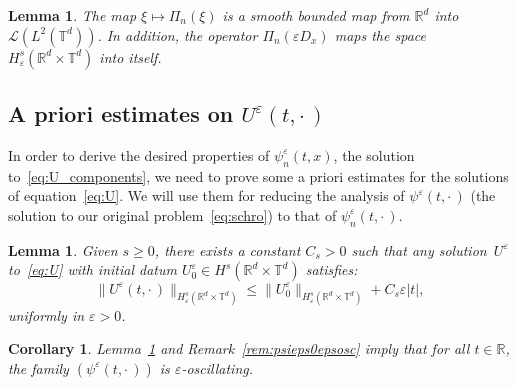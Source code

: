 \documentclass[10pt]{amsart}
\newtheorem{lemm}[cdrthm]{Lemma}
\newtheorem{coro}[cdrthm]{Corollary}
\theoremstyle{definition}
\newcommand*\R{{\mathbb R}}
\newcommand*\T{{\mathbb T}}
\newcommand*\eps{\varepsilon}
\numberwithin{equation}{section}
\begin{document}
\begin{lemm}\label{boundednessdPi}
The map $\xi\mapsto \Pi_n(\xi)$ is a smooth bounded map from $\R^d$ into ${\mathcal L} (L^2(\T^d))$. In addition, the operator $\Pi_n(\eps D_x)$ maps the space $H^s_\eps(\R^d\times\T^d)$ into itself.
\end{lemm}



\subsection{A priori estimates on \texorpdfstring{$U^\eps(t,\cdot\,)$}{U eps(t,.)} }

In order to derive the desired properties of $\psi^\eps_n(t,x)$, the solution to~\eqref{eq:U_components}, we need to prove some a priori estimates for the solutions of equation~\eqref{eq:U}. We will use them for reducing the analysis of $\psi^\eps(t,\cdot\,)$ (the solution to our original problem~\eqref{eq:schro}) to that of $\psi^\eps_n(t,\cdot\,)$.


\begin{lemm}\label{lem:wp}
Given $s\geq 0$, there exists a constant $C_s>0$ such that any solution~$U^\eps$ to~\eqref{eq:U} with initial datum $U^\eps_0\in H^s(\R^d\times\T^d)$ satisfies:
\begin{equation}\label{eq:wpxy}
\|U^\eps(t,\cdot\,)\|_{H^s_\eps(\R^d\times\T^d)}\leq \|U^\eps_0\|_{H^s_\eps(\R^d\times\T^d)}+C_s\eps|t|,
\end{equation}
uniformly in $\eps >0$.
\end{lemm}

\begin{coro}\label{cor:psiepsosc}
Lemma~\ref{lem:wp} and Remark~\ref{rem:psieps0epsosc} imply that for all $t\in\R$, the family $(\psi^\eps(t,\cdot\,))$ is $\eps$-oscillating.
\end{coro}
\end{document}
